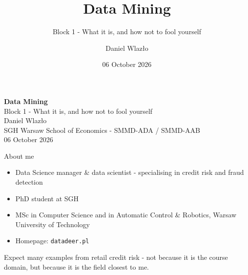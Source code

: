 \documentclass[10pt,aspectratio=169]{beamer}
\title[Data Mining]{Data Mining}
\subtitle{Block 1 - What it is, and how not to fool yourself}
\author{Daniel Wlazło}
\institute{SGH Warsaw School of Economics - SMMD-ADA / SMMD-AAB}
\date{06 October 2026}
\begin{document}
\begin{frame}[plain]
  \begin{center}
    \vspace{1cm}
    {\LARGE\textbf{Data Mining}}\\[0.5cm]
    {\large Block 1 - What it is, and how not to fool yourself}\\[1.5cm]
    {\large Daniel Wlazło} \\[0.2cm]
    {\small SGH Warsaw School of Economics - SMMD-ADA / SMMD-AAB} \\[0.2cm]
    {\small 06 October 2026}
  \end{center}
\end{frame}

\begin{frame}{About me}
  \begin{itemize}
    \item Data Science manager \& data scientist - specialising in
          \alert{credit risk} and \alert{fraud detection}
    \item PhD student at SGH
    \item MSc in Computer Science and in Automatic Control \& Robotics,
          Warsaw University of Technology
    \item Homepage: \texttt{datadeer.pl}
  \end{itemize}
  \vspace{0.8em}
  \begin{center}\small
    Expect many examples from retail credit risk - not because it is the
    course domain, but because it is the field closest to me.
  \end{center}
\end{frame}
\end{document}
